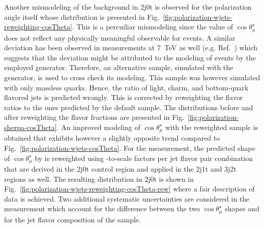 
Another mismodeling of the \wjets background in 2j0t is observed for the polarization angle itself whose distribution is presented in Fig.~\ref{fig:polarization-wjets-reweighting-cosTheta}. This is a percuiliar mismodeling since the value of $\cos\theta_\mu^\star$ does not reflect any physically meaningful observable for \wjets events. A similar deviation has been observed in measurements at 7~TeV as well (e.g. Ref.~\cite{Komm-thesis}) which suggests that the deviation might be attributed to the modeling of \wjets events by the employed \MG generator. Therefore, an alternative \wjets sample, simulated with the \SHERPA generator, is used to cross check its modeling. This sample was however simulated with only massless quarks. Hence, the ratio of light, charm, and bottom-quark flavored jets is predicted wrongly. This is corrected by reweighting the flavor ratios to the ones predicted by the default \MG sample. The distributions before and after reweighting the flavor fractions are presented in Fig.~\ref{fig:polarization-sherpa-cosTheta}. An improved modeling of $\cos\theta_{\mu}^\star$ with the reweighted \SHERPA sample is obtained that exhibits however a slightly opposite trend compared to Fig.~\ref{fig:polarization-wjets-cosTheta}. For the measurement, the predicted shape of $\cos\theta_{\mu}^\star$ by \MG is reweighted using \MG-to-\SHERPA scale factors per jet flavor pair combination that are derived in the 2j0t control region and applied in the 2j1t and 3j2t regions as well. The resulting distribution in 2j0t is shown in Fig.~\ref{fig:polarization-wjets-reweighting-cosTheta-rew} where a fair description of data is achieved. Two additional systematic uncertainties are considered in the measurement which account for the difference between the two $\cos\theta_\mu^\star$ shapes and for the jet flavor composition of the \wjets sample.


